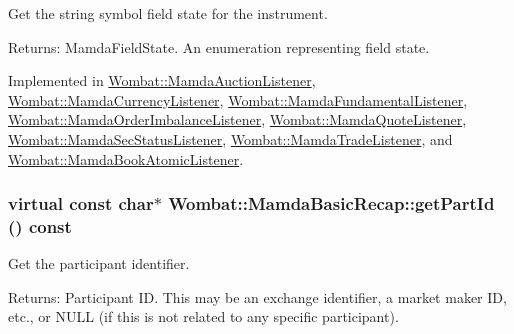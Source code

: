 Get the string symbol field state for the instrument. 

\begin{Desc}
\item[Returns:]Mamda\-Field\-State. An enumeration representing field state. \end{Desc}


Implemented in \hyperlink{classWombat_1_1MamdaAuctionListener_d8ba0fa1c6fc027fe676cd72ec17007a}{Wombat::Mamda\-Auction\-Listener}, \hyperlink{classWombat_1_1MamdaCurrencyListener_80336ebcd54d9fdb027c620335529f1a}{Wombat::Mamda\-Currency\-Listener}, \hyperlink{classWombat_1_1MamdaFundamentalListener_ed5b159cacedf11c8beb00bf02c78561}{Wombat::Mamda\-Fundamental\-Listener}, \hyperlink{classWombat_1_1MamdaOrderImbalanceListener_0598f54a0e0c05667551187418173c22}{Wombat::Mamda\-Order\-Imbalance\-Listener}, \hyperlink{classWombat_1_1MamdaQuoteListener_e5281f487264bda71fde9182921d6ae5}{Wombat::Mamda\-Quote\-Listener}, \hyperlink{classWombat_1_1MamdaSecStatusListener_a4642e50a6f7606ddf2eb510356468da}{Wombat::Mamda\-Sec\-Status\-Listener}, \hyperlink{classWombat_1_1MamdaTradeListener_ddcc8f4fae7a6d944ccc4021fd5ac492}{Wombat::Mamda\-Trade\-Listener}, and \hyperlink{classWombat_1_1MamdaBookAtomicListener_6d0fa4b94f34bf538d1324ee65a08cdf}{Wombat::Mamda\-Book\-Atomic\-Listener}.\hypertarget{classWombat_1_1MamdaBasicRecap_9aaa6f48d5e0bf04f98125378525241d}{
\subsubsection[getPartId]{\setlength{\rightskip}{0pt plus 5cm}virtual const char$\ast$ Wombat::Mamda\-Basic\-Recap::get\-Part\-Id () const}}
\label{classWombat_1_1MamdaBasicRecap_9aaa6f48d5e0bf04f98125378525241d}


Get the participant identifier. 

\begin{Desc}
\item[Returns:]Participant ID. This may be an exchange identifier, a market maker ID, etc., or NULL (if this is not related to any specific participant). \end{Desc}


